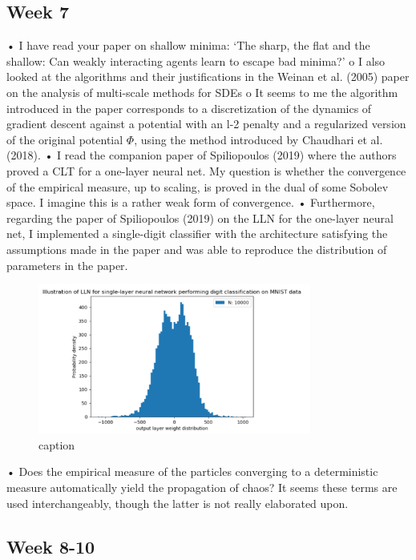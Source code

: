 \documentclass{article}
\begin{document}
\subsection{Week 7}
•	I have read your paper on shallow minima: ‘The sharp, the flat and the shallow: Can weakly interacting agents learn to escape bad minima?’
o	I also looked at the algorithms and their justifications in the Weinan et al. (2005) paper on the analysis of multi-scale methods for SDEs
o	It seems to me the algorithm introduced in the paper corresponds to a discretization of the dynamics of gradient descent against a potential with an l-2 penalty and a regularized version of the original potential $\Phi$, using the method introduced by Chaudhari et al. (2018).
•	I read the companion paper of Spiliopoulos (2019) where the authors proved a CLT for a one-layer neural net. My question is whether the convergence of the empirical measure, up to scaling, is proved in the dual of some Sobolev space. I imagine this is a rather weak form of convergence.
•	Furthermore, regarding the paper of Spiliopoulos (2019) on the LLN for the one-layer neural net, I implemented a single-digit classifier with the architecture satisfying the assumptions made in the paper and was able to reproduce the distribution of parameters in the paper.

\begin{figure}[H]
    \centering
    \includegraphics[width=0.8\textwidth]{images/Spiliopoulos2019-LLN-singleNN-mnist.png}
    \caption{ caption}
    \label{fig: label of figure}
\end{figure}

•	Does the empirical measure of the particles converging to a deterministic measure automatically yield the propagation of chaos? It seems these terms are used interchangeably, though the latter is not really elaborated upon.  

\subsection{Week 8-10}
\end{document}
